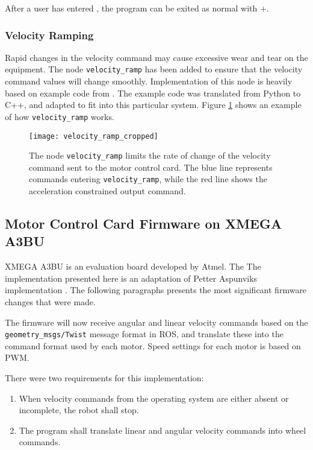 After a user has entered , the program can be exited as normal with $+$.

\subsubsection{Velocity Ramping}

Rapid changes in the velocity command may cause excessive wear and tear on the equipment. The node \texttt{velocity\_ramp} has been added to ensure that the velocity command values will change smoothly. Implementation of this node is heavily based on example code from \cite{rosbook15}. The example code was translated from Python to C++, and adapted to fit into this particular system. Figure \ref{fig:velocity_ramp} shows an example of how \texttt{velocity\_ramp} works.

\begin{figure}[h]
	\centering
	\texttt{[image: velocity\_ramp\_cropped]}
	\caption{The node \texttt{velocity\_ramp} limits the rate of change of the velocity command sent to the motor control card. The blue line represents commands entering \texttt{velocity\_ramp}, while the red line shows the acceleration constrained output command.}
	\label{fig:velocity_ramp}
\end{figure}


\subsection{Motor Control Card Firmware on XMEGA A3BU}

XMEGA A3BU is an evaluation board developed by Atmel. The The implementation presented here is an adaptation of Petter Aspunviks implementation \cite{aspunvik}. The following paragraphs presents the most significant firmware changes that were made.

The firmware will now receive angular and linear velocity commands based on the \texttt{geometry\_msgs/Twist} message format in \ac{ROS}, and translate these into the command format used by each motor. Speed settings for each motor is based on \ac{PWM}. 

\newpage

There were two requirements for this implementation: 
\begin{enumerate}
\item When velocity commands from the operating system are either absent or incomplete, the robot shall stop.
\item The program shall translate linear and angular velocity commands into wheel commands.
\end{enumerate}

